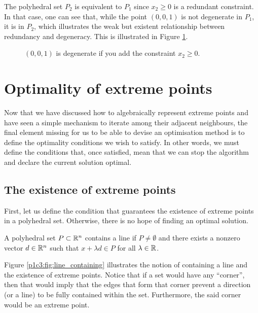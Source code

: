 %
The polyhedral set $P_2$ is equivalent to $P_1$ since $x_2 \ge 0$ is a redundant constraint. In that case, one can see that, while the point $(0,0,1)$ is not degenerate in $P_1$, it is in $P_2$, which illustrates the weak but existent relationship between redundancy and degeneracy. This is illustrated in Figure \ref{p1c3:fig:redundancy_and_degeneration}.
%
\begin{figure}[h]
    \caption{$(0,0,1)$ is degenerate if you add the constraint $x_2 \ge 0$.} \label{p1c3:fig:redundancy_and_degeneration}
\end{figure}


\section{Optimality of extreme points}

Now that we have discussed how to algebraically represent extreme points and have seen a simple mechanism to iterate among their adjacent neighbours, the final element missing for us to be able to devise an optimisation method is to define the optimality conditions we wish to satisfy. In other words, we must define the conditions that, once satisfied, mean that we can stop the algorithm and declare the current solution optimal.


\subsection{The existence of extreme points}

First, let us define the condition that guarantees the existence of extreme points in a polyhedral set. Otherwise, there is no hope of finding an optimal solution.

\begin{definition}\label{p1c3:def:line_containing}
	A polyhedral set $P \subset \mathbb{R}^n$ contains a line if $P \neq \emptyset$ and there exists a nonzero vector $d \in \mathbb{R}^n$ such that $x + \lambda d \in P$ for all $\lambda \in \mathbb{R}$.
\end{definition}

Figure \ref{p1c3:fig:line_containing} illustrates the notion of containing a line and the existence of extreme points. Notice that if a set would have any ``corner'', then that would imply that the edges that form that corner prevent a direction (or a line) to be fully contained within the set. Furthermore, the said corner would be an extreme point.

